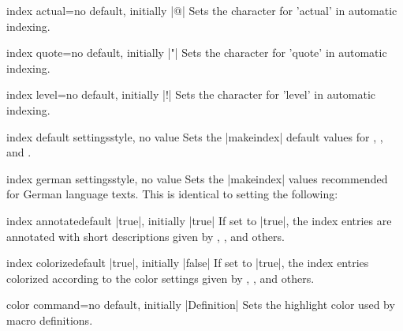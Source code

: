 \begin{docTcbKey}{index actual}{=}{no default, initially |@|}
  Sets the character for 'actual' in automatic indexing.
\end{docTcbKey}

\begin{docTcbKey}{index quote}{=}{no default, initially |"|}
  Sets the character for 'quote' in automatic indexing.
\end{docTcbKey}

\begin{docTcbKey}{index level}{=}{no default, initially |!|}
  Sets the character for 'level' in automatic indexing.
\end{docTcbKey}

\begin{docTcbKey}{index default settings}{}{style, no value}
  Sets the |makeindex| default values for
  ,
  , and
  .
\end{docTcbKey}


\begin{docTcbKey}{index german settings}{}{style, no value}
  Sets the |makeindex| values recommended for German language texts.
  This is identical to setting the following:
\begin{dispListing}
\end{dispListing}
\end{docTcbKey}

\clearpage

\begin{docTcbKey}{index annotate}{}{default |true|, initially |true|}
  If set to |true|, the index entries are annotated with short descriptions
  given by , ,
  and others.
\end{docTcbKey}

\begin{docTcbKey}{index colorize}{}{default |true|, initially |false|}
  If set to |true|, the index entries colorized according to the color
  settings given by , ,
  and others.
\end{docTcbKey}


\begin{docTcbKey}{color command}{=}{no default, initially |Definition|}
  Sets the highlight color used by macro definitions.
\end{docTcbKey}

